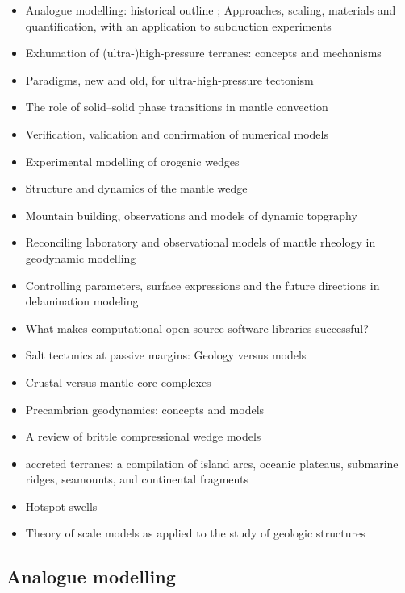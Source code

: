 \begin{itemize}
\item Analogue modelling: historical outline \cite{koyi97}; Approaches, scaling, materials and quantification, with an application to subduction experiments \cite{scst16}
\item Exhumation of (ultra-)high-pressure terranes: concepts and mechanisms \cite{warr13}
\item Paradigms, new and old, for ultra-high-pressure tectonism \cite{hage13}
\item The role of solid–solid phase transitions in mantle convection \cite{fada17}
\item Verification, validation and confirmation of numerical models \cite{orsb94}
\item Experimental modelling of orogenic wedges \cite{grmd12}
\item Structure and dynamics of the mantle wedge \cite{vank03}
\item Mountain building, observations and models of dynamic topgraphy \cite{flgm13,fabc13}
\item Reconciling laboratory and observational models of mantle rheology in geodynamic modelling \cite{king16}
\item Controlling parameters, surface expressions and the future directions in delamination modeling \cite{goue18}
\item What makes computational open source software libraries successful? \cite{bahe13}
\item Salt tectonics at passive margins: Geology versus models \cite{brfo11}
\item Crustal versus mantle core complexes \cite{brst18}
\item Precambrian geodynamics: concepts and models \cite{gery14}
\item A review of brittle compressional wedge models \cite{buit12}
\item accreted terranes: a compilation of island arcs, oceanic
      plateaus, submarine ridges, seamounts, and continental fragments \cite{tebu14}
\item Hotspot swells \cite{kiad14}
\item Theory of scale models as applied to the study of geologic structures \cite{hubb37}

\end{itemize}

\subsection{Analogue modelling}

